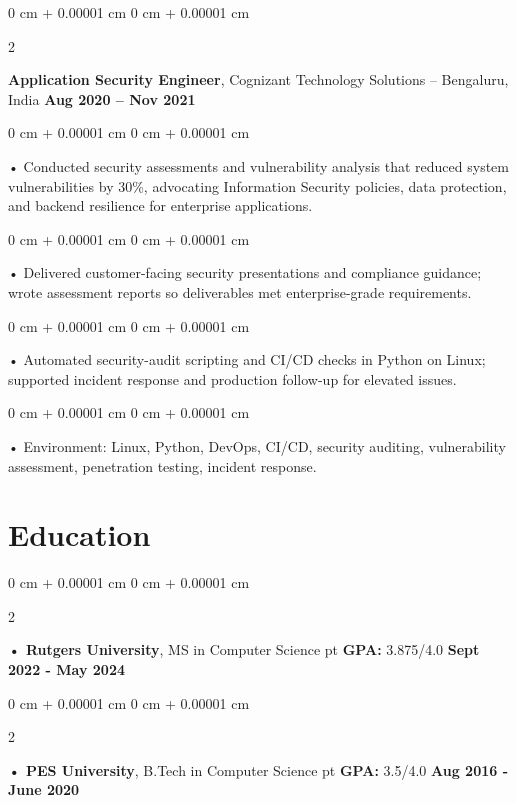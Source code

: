 \documentclass[10pt, letterpaper]{article}
\newenvironment{onecolentry}{
    \begin{adjustwidth}{
        0 cm + 0.00001 cm
    }{
        0 cm + 0.00001 cm
    }
}{
    \end{adjustwidth}
} %
\newenvironment{twocolentry}[2][]{
    \onecolentry
    \def\secondColumn{#2}
    \setcolumnwidth{\fill, 4.5 cm}
    \begin{paracol}{2}
}{
    \switchcolumn \raggedleft \secondColumn
    \end{paracol}
    \endonecolentry
} %
\begin{document}
        \begin{twocolentry}{
            \textbf{Aug 2020 – Nov 2021}
        }
            \vspace{2 pt }
            \textbf{Application Security Engineer}, Cognizant Technology Solutions -- Bengaluru, India\end{twocolentry}
        \begin{onecolentry}
             • Conducted security assessments and vulnerability analysis that reduced system vulnerabilities by 30\%, advocating Information Security policies, data protection, and backend resilience for enterprise applications.
        \end{onecolentry}
        \begin{onecolentry}
             • Delivered customer-facing security presentations and compliance guidance; wrote assessment reports so deliverables met enterprise-grade requirements.
        \end{onecolentry}
        \begin{onecolentry}
             • Automated security-audit scripting and CI/CD checks in Python on Linux; supported incident response and production follow-up for elevated issues.
        \end{onecolentry}
        \begin{onecolentry}
             • Environment: Linux, Python, DevOps, CI/CD, security auditing, vulnerability assessment, penetration testing, incident response.
        \end{onecolentry}
    \vspace{2 pt }
        \section{Education}
        \vspace{2 pt }
        \begin{twocolentry}{
            \textbf{Sept 2022 - May 2024}
        }
            \textbf{ • Rutgers University}, MS in Computer Science  pt \textbf{GPA:} 3.875/4.0  \end{twocolentry}

        \begin{twocolentry}{
            \textbf{Aug 2016 - June 2020}
        }
            \textbf{ • PES University}, B.Tech in Computer Science  pt \textbf{GPA:} 3.5/4.0  \end{twocolentry}

    \vspace{0.4cm}
\end{document}
